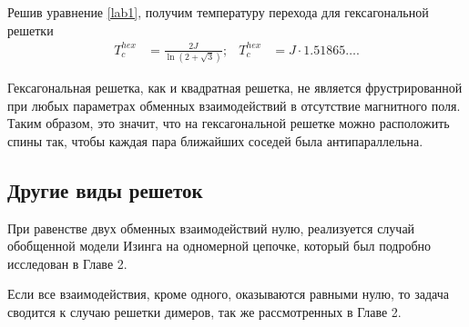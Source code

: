 Решив уравнение \eqref{lab1}, получим температуру перехода для гексагональной решетки
\begin{align}
T_c^{hex} &= \frac{2J}{\ln (2 + \sqrt{3})};& T_c^{hex} &= J \cdot 1.51865\dots.
\end{align}

Гексагональная решетка, как и квадратная решетка, не является фрустрированной при любых параметрах обменных взаимодействий в отсутствие магнитного поля. Таким образом, это значит, что на гексагональной решетке можно расположить спины так, чтобы каждая пара ближайших соседей была антипараллельна.

\subsection{Другие виды решеток}

При равенстве двух обменных взаимодействий нулю, реализуется случай обобщенной модели Изинга на одномерной цепочке, который был подробно исследован в Главе 2.

Если все взаимодействия, кроме одного, оказываются равными нулю, то задача сводится к случаю решетки димеров, так же рассмотренных в Главе 2.

\FloatBarrier